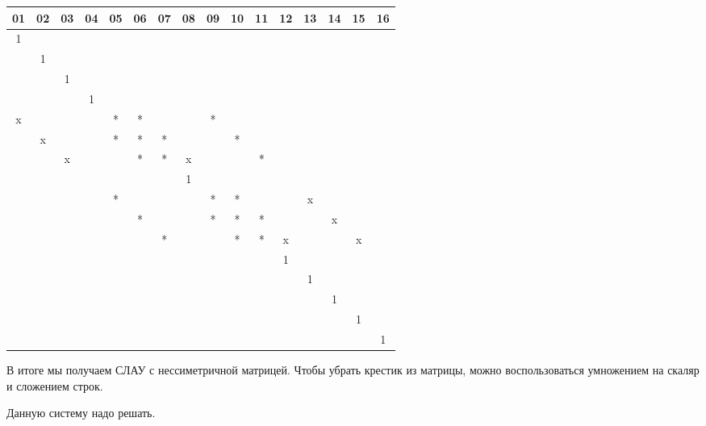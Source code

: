 \begin{center}
\begin{tabular}{ c c c c | c c c c | c c c c | c c c c }
01 & 02 & 03 & 04 & 05 & 06 & 07 & 08 & 09 & 10 & 11 & 12 & 13 & 14 & 15 & 16 \\
\hline 
1 & & & & & & & & & & & & & & & \\
 & 1 & & & & & & & & & & & & & & \\
 & & 1 & & & & & & & & & & & & & \\
 & & & 1 & & & & & & & & & & & & \\
\hline
 x & & & & * & * & & & * & & & & & & & \\
 & x & & & * & * & * & & & * & & & & & & \\
 & & x & & & * & * & x & & & * & & & & & \\
 & & & & & & & 1 & & & & & & & & \\
\hline 
 & & & & * & & & & * & * & & & x & & & \\
 & & & & & * & & & * & * & * & & & x & & \\
 & & & & & & * & & & * & * & x & & & x & \\
 & & & & & & & & & & & 1 & & & & \\
\hline
 & & & & & & & & & & & & 1 & & & \\
 & & & & & & & & & & & & & 1 & & \\
 & & & & & & & & & & & & & & 1 & \\
 & & & & & & & & & & & & & & & 1
\end{tabular}
\end{center}

В итоге мы получаем СЛАУ с нессиметричной матрицей. Чтобы убрать крестик из матрицы, можно воспользоваться умножением на скаляр и сложением строк.

Данную систему надо решать.
